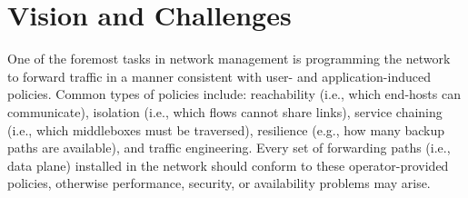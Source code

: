 \section{Vision and Challenges} \label{sec:vision}

One of the foremost tasks in network management is programming the network to
forward traffic in a manner consistent with user- and application-induced
policies. Common types of policies include: reachability (i.e., which
end-hosts can communicate), isolation (i.e., which flows cannot share links),
service chaining (i.e., which middleboxes must be traversed), resilience
(e.g., how many backup paths are available), and traffic engineering. Every
set of forwarding paths (i.e., data plane) installed in the network
should conform to these operator-provided
policies, otherwise performance, security, or availability problems may arise.

